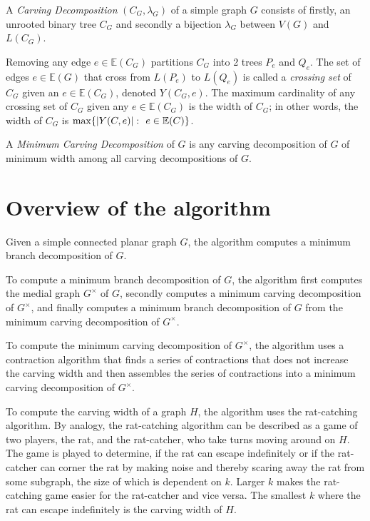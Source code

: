 \documentclass{article}
\begin{document}
	\begin{center}
		
	\end{center}

	A \textit{Carving Decomposition} $(C_G, \lambda_G)$ of a simple graph $G$ consists of firstly, an unrooted binary tree $C_G$ and secondly a bijection $\lambda_G$ between $V(G)$ and $L(C_G)$.

	Removing any edge $e \in \mathbb{E}(C_G)$ partitions $C_G$ into 2 trees $P_e$ and $Q_e$. The set of edges $e \in \mathbb{E}(G)$ that cross from $L(P_e)$ to $L(Q_e)$ is called a \textit{crossing set} of $C_G$ given an $e \in \mathbb{E}(C_G)$, denoted $Y(C_G,e)$. The maximum cardinality of any crossing set of $C_G$ given any $e \in \mathbb{E}(C_G)$ is the width of $C_G$; in other words, the width of $C_G$ is $\max\{ |Y(C, e)| \,\colon\  e \in \mathbb{E}(C) \}$.

	A \textit{Minimum Carving Decomposition} of $G$ is any carving decomposition of $G$ of minimum width among all carving decompositions of $G$.

	\begin{center}
		
	\end{center}

\section{Overview of the algorithm}

	Given a simple connected planar graph $G$, the algorithm computes a minimum branch decomposition of $G$.

	To compute a minimum branch decomposition of $G$, the algorithm first computes the medial graph $G^\times$ of $G$, secondly computes a minimum carving decomposition of $G^\times$, and finally computes a minimum branch decomposition of $G$ from the minimum carving decomposition of $G^\times$.

	To compute the minimum carving decomposition of $G^\times$, the algorithm uses a contraction algorithm that finds a series of contractions that does not increase the carving width and then assembles the series of contractions into a minimum carving decomposition of $G^\times$.

	To compute the carving width of a graph $H$, the algorithm uses the rat-catching algorithm. By analogy, the rat-catching algorithm can be described as a game of two players, the rat, and the rat-catcher, who take turns moving around on $H$. The game is played to determine, if the rat can escape indefinitely or if the rat-catcher can corner the rat by making noise and thereby scaring away the rat from some subgraph, the size of which is dependent on $k$. Larger $k$ makes the rat-catching game easier for the rat-catcher and vice versa. The smallest $k$ where the rat can escape indefinitely is the carving width of $H$.
\end{document}
